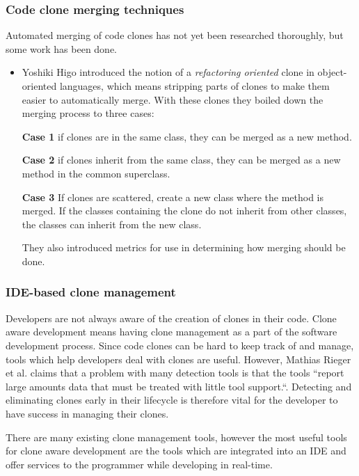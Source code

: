 \documentclass[12pt]{article}
\begin{document}
\subsubsection{Code clone merging techniques}

Automated merging of code clones has not yet been researched thoroughly, but some work has
been done.

\begin{itemize}
    \item 
Yoshiki Higo\cite{RefactoringOrientedClonesAndMerging} introduced the notion of a
\textit{refactoring oriented} clone in object-oriented languages, which means stripping
parts of clones to make them easier to automatically merge. With these clones they boiled
down the merging process to three cases:

\textbf{Case 1} if clones are in the same class, they can be merged as a new method.

\textbf{Case 2} if clones inherit from the same class, they can be merged as a new
method in the common superclass.

\textbf{Case 3} If clones are scattered, create a new class where the method is merged. If
the classes containing the clone do not inherit from other classes, the classes can
inherit from the new class.

They also introduced metrics for use in determining how merging should be done.
\end{itemize}

\subsubsection{IDE-based clone management}

Developers are not always aware of the creation of clones in their code. Clone aware
development means having clone management as a part of the software development
process. Since code clones can be hard to keep track of and manage, tools which help
developers deal with clones are useful. However, Mathias Rieger et al. claims that
a problem with many detection tools is that the tools ``report large amounts data that must
be treated with little tool support.``\cite[1]{InsightsSystemWideDuplication}. Detecting
and eliminating clones early in their lifecycle is therefore vital for the developer to
have success in managing their clones.

There are many existing clone management tools, however the most useful tools for clone
aware development are the tools which are integrated into an IDE and offer services to the
programmer while developing in real-time.
\end{document}
